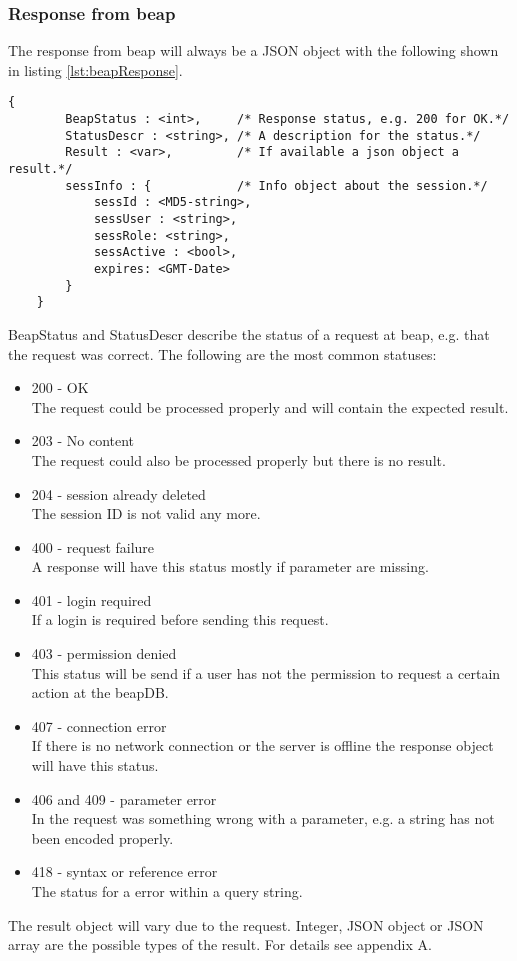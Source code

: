 \documentclass[12pt,a4paper,oneside]{report}
\begin{document}
\subsubsection{Response from beap}
The response from beap will always be a JSON object with the following shown in listing \ref{lst:beapResponse}. 
\lstset{language=JavaScript}
\begin{lstlisting}[caption=Json object for beap response, label=lst:beapResponse]
{
		BeapStatus : <int>, 	/* Response status, e.g. 200 for OK.*/
		StatusDescr : <string>, /* A description for the status.*/
		Result : <var>,         /* If available a json object a result.*/
		sessInfo : {			/* Info object about the session.*/
			sessId : <MD5-string>,
			sessUser : <string>,
			sessRole: <string>,
			sessActive : <bool>,
			expires: <GMT-Date>  
		}
	}
\end{lstlisting}
\lstset{language=java}
BeapStatus and StatusDescr describe the status of a request at beap, e.g. that the request was correct. The following are the most common statuses:
\begin{itemize}
\item{200 - OK}
\\The request could be processed properly and will contain the expected result.
\item{203 - No content}
\\The request could also be processed properly but there is no result.
\item{204 - session already deleted}
\\The session ID is not valid any more.
\item{400 - request failure}
\\A response will have this status mostly if parameter are missing.
\item{401 - login required}
\\If a login is required before sending this request.
\item{403 - permission denied}
\\This status will be send if a user has not the permission to request a certain action at the beapDB.
\item{407 - connection error}
\\If there is no network connection or the server is offline the response object will have this status.
\item{406 and 409 - parameter error}
\\In the request was something wrong with a parameter, e.g. a string has not been encoded properly.
\item{418 - syntax or reference error}
\\The status for a error within a query string.
\end{itemize}
The result object will vary due to the request. Integer, JSON object or JSON array are the possible types of the result. 
For details see appendix A.
\end{document}
